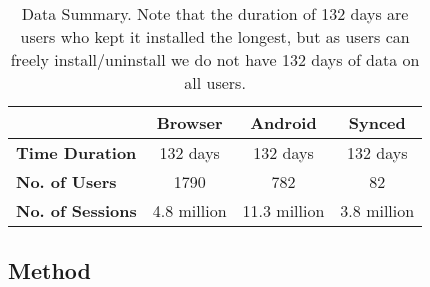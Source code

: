 \begin{table}[tb]
\caption{Data Summary. Note that the duration of 132 days are users who kept it installed the longest, but as users can freely install/uninstall we do not have 132 days of data on all users. %
}
\begin{tabular}{@{}lcccl@{}}
\toprule
                         & \textbf{Browser} & \textbf{Android} & \multicolumn{2}{c}{\textbf{Synced}} \\ \midrule
\textbf{Time Duration} & 132 days             & 132 days              & \multicolumn{2}{c}{132 days} \\
\textbf{No. of Users}    & 1790             & 782              & \multicolumn{2}{c}{82}             \\
\textbf{No. of Sessions} & 4.8 million           & 11.3 million          & \multicolumn{2}{l}{3.8 million}                \\ \bottomrule
\end{tabular}
\label{tab:data_summary}
\end{table}

\subsection{Method}


